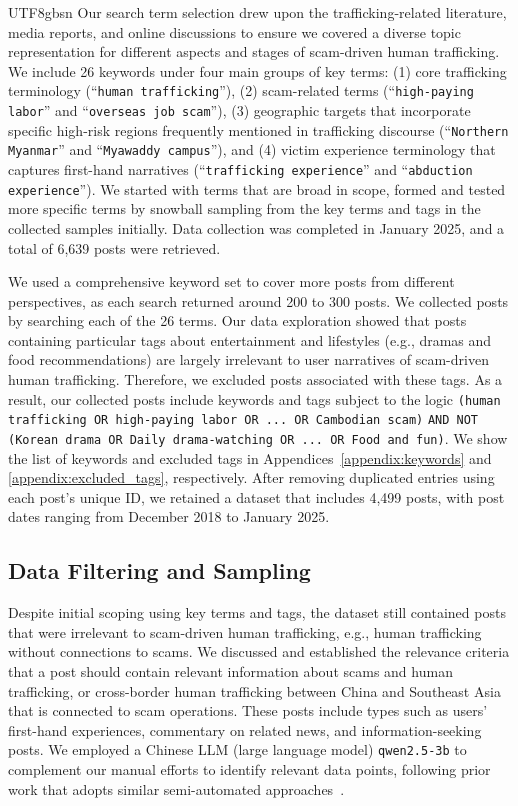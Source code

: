 \documentclass[sigconf,nonacm]{acmart}
\begin{document}
\begin{CJK}{UTF8}{gbsn}
Our search term selection drew upon the trafficking-related literature, media reports, and online discussions to ensure we covered a diverse topic representation for different aspects and stages of scam-driven human trafficking. We include 26 keywords under four main groups of key terms: (1) core trafficking terminology (``\texttt{human trafficking}''), (2) scam-related terms (``\texttt{high-paying labor}'' and ``\texttt{overseas job scam}''), (3) geographic targets that incorporate specific high-risk regions frequently mentioned in trafficking discourse (``\texttt{Northern Myanmar}'' and ``\texttt{Myawaddy campus}''), and (4) victim experience terminology that captures first-hand narratives (``\texttt{trafficking experience}'' and ``\texttt{abduction experience}''). We started with terms that are broad in scope, formed and tested more specific terms by snowball sampling from the key terms and tags in the collected samples initially. Data collection was completed in January 2025, and a total of 6,639 posts were retrieved.  

We used a comprehensive keyword set to cover more posts from different perspectives, as each search returned around 200 to 300 posts. We collected posts by searching each of the 26 terms. Our data exploration showed that posts containing particular tags about entertainment and lifestyles (e.g., dramas and food recommendations) are largely irrelevant to user narratives of scam-driven human trafficking. Therefore, we excluded posts associated with these tags. As a result, our collected posts include keywords and tags subject to the logic \texttt{(human trafficking OR high-paying labor OR ... OR Cambodian scam)} \texttt{AND NOT} \texttt{(Korean drama OR Daily drama-watching OR ... OR Food and fun)}. We show the list of keywords and excluded tags in Appendices~\ref{appendix:keywords} and \ref{appendix:excluded_tags}, respectively. After removing duplicated entries using each post's unique ID, we retained a dataset that includes 4,499 posts, with post dates ranging from December 2018 to January 2025.

\subsection{Data Filtering and Sampling}

Despite initial scoping using key terms and tags, the dataset still contained posts that were irrelevant to scam-driven human trafficking, e.g., human trafficking without connections to scams. We discussed and established the relevance criteria that a post should contain relevant information about scams and human trafficking, or cross-border human trafficking between China and Southeast Asia that is connected to scam operations. These posts include types such as users' first-hand experiences, commentary on related news, and information-seeking posts. We employed a Chinese LLM (large language model) \texttt{qwen2.5-3b} to complement our manual efforts to identify relevant data points, following prior work that adopts similar semi-automated approaches~\cite{wei2024understanding}.


\end{CJK}
\end{document}

